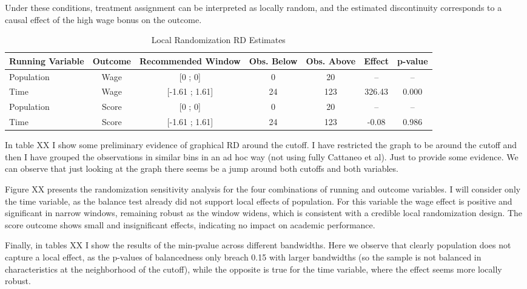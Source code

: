 \documentclass{article}
\begin{document}
Under these conditions, treatment assignment can be interpreted as locally random, and the estimated discontinuity corresponds to a causal effect of the high wage bonus on the outcome.


\begin{table}[H]
\centering
\caption{Local Randomization RD Estimates}
\begin{tabular}{lcccccc}
\toprule
\textbf{Running Variable} & \textbf{Outcome} & \textbf{Recommended Window} & \textbf{Obs. Below} & \textbf{Obs. Above} & \textbf{Effect} & \textbf{p-value} \\
\midrule
Population & Wage  & [0 ; 0]             & 0   & 20  & --      & --     \\
Time       & Wage  & [-1.61 ; 1.61]      & 24  & 123 & 326.43  & 0.000  \\
Population & Score & [0 ; 0]             & 0   & 20  & --      & --     \\
Time       & Score & [-1.61 ; 1.61]      & 24  & 123 & -0.08   & 0.986  \\
\bottomrule
\end{tabular}
\label{table1_localrd}
\end{table}

In table XX I show some preliminary evidence of graphical RD around the cutoff. I have restricted the graph to be around the cutoff and then I have grouped the observations in similar bins in an ad hoc way (not using fully Cattaneo et al). Just to provide some evidence. We can observe that just looking at the graph there seems be a jump around both cutoffs and both variables. 

Figure XX presents the randomization sensitivity analysis for the four combinations of running and outcome variables. I will consider only the time variable, as the balance test already did not support local effects of population. For this variable the wage effect is positive and significant in narrow windows, remaining robust as the window widens, which is consistent with a credible local randomization design. The score outcome shows small and insignificant effects, indicating no impact on academic performance.

Finally, in tables XX I show the results of the min-pvalue across different bandwidths. Here we observe that clearly population does not capture a local effect, as the p-values of balancedness only breach 0.15 with larger bandwidths (so the sample is not balanced in characteristics at the neighborhood of the cutoff), while the opposite is true for the time variable, where the effect seems more locally robust. 
\end{document}
